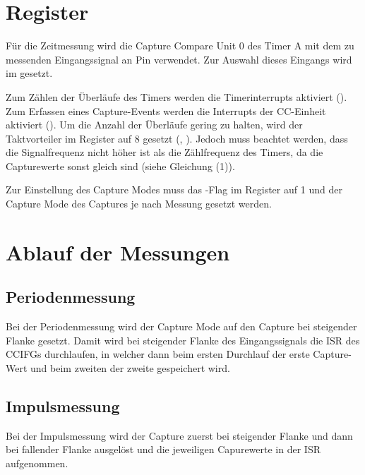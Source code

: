 \documentclass[a4paper, 12pt]{article}
\begin{document}
  
  \clearpage
  \setcounter{page}{1}

  \section{Register}
  Für die Zeitmessung wird die Capture Compare Unit 0 des Timer A mit dem zu
  messenden Eingangssignal an Pin  verwendet. Zur Auswahl dieses Eingangs
  wird im   gesetzt.

  Zum Zählen der Überläufe des Timers werden die Timerinterrupts aktiviert
  (). Zum Erfassen eines Capture-Events werden die Interrupts
  der CC-Einheit aktiviert ().
  Um die Anzahl der Überläufe gering zu halten, wird der Taktvorteiler im
   Register auf 8 gesetzt (,
  ). Jedoch muss beachtet werden, dass die Signalfrequenz
  nicht höher ist als die Zählfrequenz des Timers, da die Capturewerte sonst
  gleich sind (siehe Gleichung (1)).

  Zur Einstellung des Capture Modes muss das
  -Flag im  Register auf 1 und der Capture
  Mode  des Captures je nach Messung gesetzt werden.
 
  \section{Ablauf der Messungen}

  \subsection{Periodenmessung}
  Bei der Periodenmessung wird der Capture Mode auf den Capture bei steigender
  Flanke gesetzt. Damit wird bei steigender Flanke des Eingangssignals die ISR
  des CCIFGs durchlaufen, in welcher dann beim ersten Durchlauf der erste
  Capture-Wert und beim zweiten der zweite gespeichert wird.

  \subsection{Impulsmessung}
  Bei der Impulsmessung wird der Capture zuerst bei steigender Flanke und dann
  bei fallender Flanke ausgelöst und die jeweiligen Capurewerte in der ISR aufgenommen.
\end{document}
